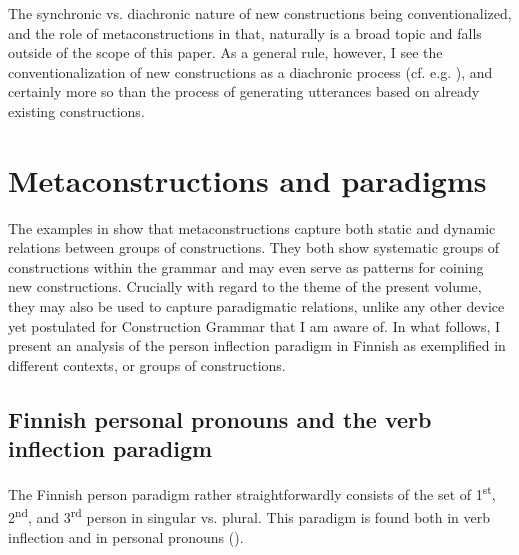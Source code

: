 \documentclass[output=paper, colorlinks,citecolor=brown]{langsci/langscibook}
\begin{document}
The synchronic vs. diachronic nature of new constructions being conventionalized, and the role of metaconstructions in that, naturally is a broad topic and falls outside of the scope of this paper. As a general rule, however, I see the conventionalization of new constructions as a diachronic process (cf. e.g. \citealt{Rostila2006}), and certainly more so than the process of generating utterances based on already existing constructions.

\section{Metaconstructions and paradigms}\label{leino_sec4}

The examples in  show that metaconstructions capture both static and dynamic relations between groups of constructions. They both show systematic groups of constructions within the grammar and may even serve as patterns for coining new constructions. Crucially with regard to the theme of the present volume, they may also be used to capture paradigmatic relations, unlike any other device yet postulated for Construction Grammar that I am aware of. In what follows, I present an analysis of the person inflection paradigm in Finnish as exemplified in different contexts, or groups of constructions.

\subsection{Finnish personal pronouns and the verb inflection paradigm}\label{sec:leino_4.1}

The Finnish person paradigm rather straightforwardly consists of the set of 1\textsuperscript{st}, 2\textsuperscript{nd}, and 3\textsuperscript{rd} person in singular vs. plural. This paradigm is found both in verb inflection and in personal pronouns ().
\end{document}
